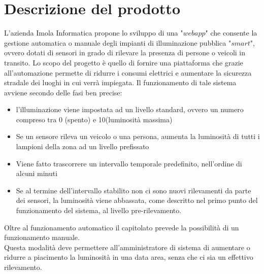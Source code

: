 \documentclass[12pt]{article}
\begin{document}
\section{Descrizione del prodotto}
L'azienda Imola Informatica propone lo sviluppo di una "$webapp$" che consente la gestione automatica o manuale degli impianti di illuminazione pubblica "$smart$", ovvero dotati di sensori in grado di rilevare la presenza di persone o veicoli in transito.
Lo scopo del progetto è quello di fornire una piattaforma che grazie all'automazione permette di ridurre i consumi elettrici e aumentare la sicurezza stradale dei luoghi in cui verrà impiegata.
Il funzionamento di tale sistema avviene secondo delle fasi ben precise:
\begin{itemize}
	\item l'illuminazione viene impostata ad un livello standard, ovvero un numero compreso tra 0 (spento) e 10(luminosità massima)
	\item Se un sensore rileva un veicolo o una persona, aumenta la luminosità di tutti i lampioni della zona ad un livello prefissato
	\item Viene fatto trascorrere un intervallo temporale predefinito, nell'ordine di alcuni minuti
	\item Se al termine dell'intervallo stabilito non ci sono nuovi rilevamenti da parte dei sensori, la luminosità viene abbassata, come descritto nel primo punto del funzionamento del sistema, al livello pre-rilevamento.
\end{itemize}
Oltre al funzionamento automatico il capitolato prevede la possibilità di un funzionamento manuale. \\
Questa modalità deve permettere all'amministratore di sistema di aumentare o ridurre a piacimento la luminosità in una data area, senza che ci sia un effettivo rilevamento.
\end{document}
